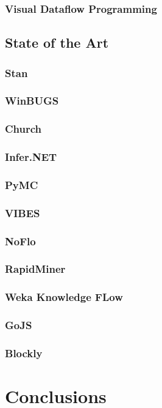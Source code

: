 \subsubsection{Visual Dataflow Programming}

\subsection{State of the Art}

\subsubsection{Stan}

\subsubsection{WinBUGS}

\subsubsection{Church}

\subsubsection{Infer.NET}

\subsubsection{PyMC}

\subsubsection{VIBES}

\subsubsection{NoFlo}

\subsubsection{RapidMiner}

\subsubsection{Weka Knowledge FLow}

\subsubsection{GoJS}

\subsubsection{Blockly}

\section{Conclusions}
